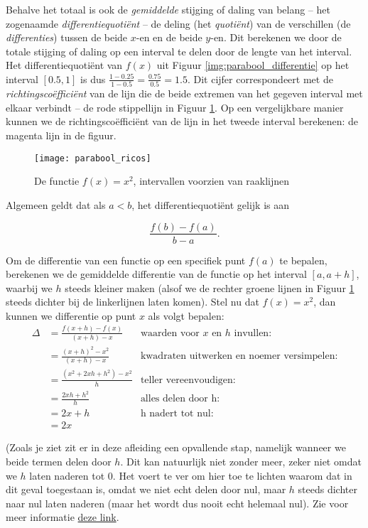     
Behalve het totaal is ook de \textit{gemiddelde} stijging of daling van belang – het zogenaamde \textit{differentiequotiënt} – de deling (het \textit{quotiënt}) van de verschillen (de \textit{differenties}) tussen de beide $x$-en en de beide $y$-en. Dit berekenen we door de totale stijging of daling op een interval te delen door de lengte van het interval. Het differentiequotiënt van $f(x)$ uit Figuur \ref{img:parabool_differentie} op het interval $\left[0.5,1\right]$ is dus $\frac{1-0.25}{1-0.5} = \frac{0.75}{0.5} = 1.5$. Dit cijfer correspondeert met de \textit{richtingscoëfficiënt} van de lijn die de beide extremen van het gegeven interval met elkaar verbindt – de rode stippellijn in Figuur \ref{img:parabool_ricos}. Op een vergelijkbare manier kunnen we de richtingscoëfficiënt van de lijn in het tweede interval berekenen: de magenta lijn in de figuur. 

\begin{figure}[h]
    \centering
    \texttt{[image: parabool\_ricos]}
    \caption{De functie $f(x) = x^2$, intervallen voorzien van raaklijnen\label{img:parabool_ricos}}
\end{figure}

Algemeen geldt dat als $a<b$, het differentiequotiënt gelijk is aan

\[
    \frac{f(b)-f(a)}{b-a}.
\]

Om de differentie van een functie op een specifiek punt $f(a)$ te bepalen, berekenen we de gemiddelde differentie van de functie op het interval $\left[a,a+h\right]$, waarbij we $h$ steeds kleiner maken (alsof we de rechter groene lijnen in Figuur \ref{img:parabool_ricos} steeds dichter bij de linkerlijnen laten komen). Stel nu dat $f(x)=x^2$, dan kunnen we differentie op punt $x$ als volgt bepalen:
\[
\begin{aligned}
    \Delta &= \frac{f(x+h)-f(x)}{(x+h) - x} & \text{waarden voor } x \text{ en } h \text{ invullen:}\\
    &= \frac{(x+h)^2 - x^2}{(x+h)-x} & \text{kwadraten uitwerken en noemer versimpelen:} \\
    &= \frac{(x^2 + 2xh + h^2)-x^2}{h} & \text {teller vereenvoudigen:} \\
    &= \frac{2xh + h^2}{h} & \text{alles delen door h:} \\
    &= 2x + h & \text{h nadert tot nul:} \\
    &= 2x
\end{aligned}
\]            

(Zoals je ziet zit er in deze afleiding een opvallende stap, namelijk wanneer we beide termen delen door $h$. Dit kan natuurlijk niet zonder meer, zeker niet omdat we $h$ laten naderen tot 0. Het voert te ver om hier toe te lichten waarom dat in dit geval toegestaan is, omdat we niet echt delen door nul, maar $h$ steeds dichter naar nul laten naderen (maar het wordt dus nooit echt helemaal nul). Zie voor meer informatie \href{https://www.wisfaq.nl/pagina.asp?nummer=1451}{deze link}.

